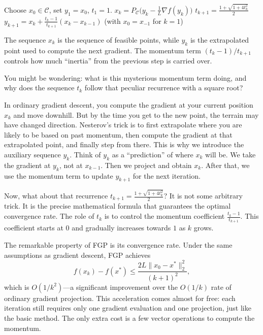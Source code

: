 \documentclass[lang=en,color=blue,mode=fancy,titlestyle=hang]{elegantbook}
\begin{document}
\begin{algorithm}[H]
\caption{Fast Gradient Projection Method}
\label{alg:fgp}
\begin{algorithmic}
\State Choose $x_0 \in \mathcal{C}$, set $y_1 = x_0$, $t_1 = 1$.
  \State $x_k = P_{\mathcal{C}}\bigl( y_k - \frac{1}{L} \nabla f(y_k) \bigr)$
  \State $t_{k+1} = \frac{1 + \sqrt{1 + 4t_k^2}}{2}$
  \State $y_{k+1} = x_k + \frac{t_k - 1}{t_{k+1}} (x_k - x_{k-1})$ \quad (with $x_0 = x_{-1}$ for $k=1$)
\EndFor
\end{algorithmic}
\end{algorithm}

The sequence $x_k$ is the sequence of feasible points, while $y_k$ is the extrapolated point used
to compute the next gradient. The momentum term $(t_k-1)/t_{k+1}$ controls how much ``inertia''
from the previous step is carried over.

You might be wondering: what is this mysterious momentum term doing, and why does the sequence $t_k$
follow that peculiar recurrence with a square root?

In ordinary gradient descent, you compute the gradient at your current position $x_k$ and move
downhill. But by the time you get to the new point, the terrain may have changed direction.
Nesterov's trick is to first extrapolate where you are likely to be based on past momentum, then
compute the gradient at that extrapolated point, and finally step from there. This is why we
introduce the auxiliary sequence $y_k$. Think of $y_k$ as a ``prediction'' of where $x_k$ will be.
We take the gradient at $y_k$, not at $x_{k-1}$. Then we project and obtain $x_k$. After that,
we use the momentum term to update $y_{k+1}$ for the next iteration.

Now, what about that recurrence $t_{k+1} = \frac{1 + \sqrt{1 + 4t_k^2}}{2}$? It is not some arbitrary
trick. It is the precise mathematical formula that guarantees the optimal convergence rate. The role
of $t_k$ is to control the momentum coefficient $\frac{t_k - 1}{t_{k+1}}$. This coefficient starts
at $0$ and gradually increases towards $1$ as $k$ grows.

The remarkable property of FGP is its convergence rate. Under the same assumptions as gradient
descent, FGP achieves
\[
f(x_k) - f(x^*) \le \frac{2L \|x_0 - x^*\|_2^2}{(k+1)^2},
\]
which is $O(1/k^2)$—a significant improvement over the $O(1/k)$ rate of ordinary gradient projection.
This acceleration comes almost for free: each iteration still requires only one gradient evaluation
and one projection, just like the basic method. The only extra cost is a few vector operations to
compute the momentum.
\end{document}
